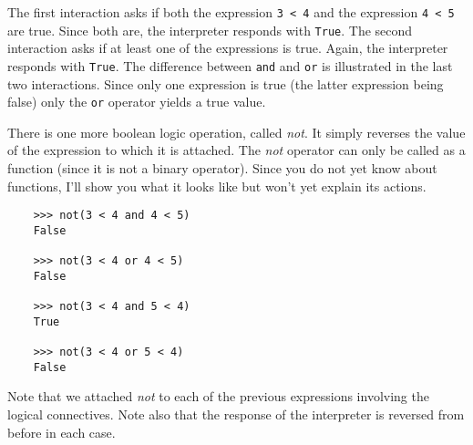 The first interaction asks if both the expression
{\tt 3 < 4} and the expression
{\tt 4 < 5} are true. Since both are, the
interpreter responds with {\tt True}. The second interaction
asks if at least one of the expressions is true. Again, the
interpreter responds with {\tt True}. The difference between {\tt and}
and {\tt or} is illustrated in the last two interactions. Since
only one expression is true (the latter expression being
false) only the {\tt or} operator yields a true value.

There is one more {\sc boolean} logic operation, called
{\it not}. It simply reverses the value of the expression
to which it is attached. The {\it not} operator can only be called
as a function (since it is not a binary operator). Since
you do not yet know about functions, I'll show you what
it looks like but won't yet explain its actions.

\begin{verbatim}
    >>> not(3 < 4 and 4 < 5)
    False
    
    >>> not(3 < 4 or 4 < 5)
    False
    
    >>> not(3 < 4 and 5 < 4)
    True
    
    >>> not(3 < 4 or 5 < 4)
    False
\end{verbatim}

Note that we attached {\it not} to each of the previous expressions involving
the logical connectives. Note also that the response of the interpreter
is reversed from before in each case.
